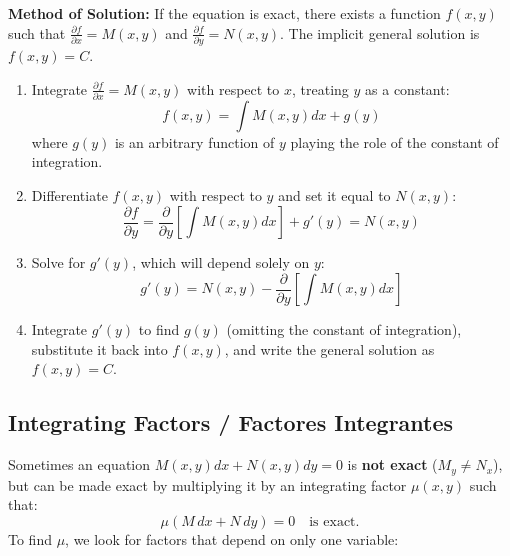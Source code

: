 \documentclass[11pt,letterpaper]{article}
\begin{document}
\textbf{Method of Solution:}
If the equation is exact, there exists a function $f(x,y)$ such that $\frac{\partial f}{\partial x} = M(x,y)$ and $\frac{\partial f}{\partial y} = N(x,y)$. The implicit general solution is $f(x,y) = C$.
\begin{enumerate}
    \item Integrate $\frac{\partial f}{\partial x} = M(x,y)$ with respect to $x$, treating $y$ as a constant:
    \begin{equation}
        f(x,y) = \int M(x,y) dx + g(y)
    \end{equation}
    where $g(y)$ is an arbitrary function of $y$ playing the role of the constant of integration.
    \item Differentiate $f(x,y)$ with respect to $y$ and set it equal to $N(x,y)$:
    \begin{equation}
        \frac{\partial f}{\partial y} = \frac{\partial}{\partial y} \left[ \int M(x,y) dx \right] + g'(y) = N(x,y)
    \end{equation}
    \item Solve for $g'(y)$, which will depend solely on $y$:
    \begin{equation}
        g'(y) = N(x,y) - \frac{\partial}{\partial y} \left[ \int M(x,y) dx \right]
    \end{equation}
    \item Integrate $g'(y)$ to find $g(y)$ (omitting the constant of integration), substitute it back into $f(x,y)$, and write the general solution as $f(x,y) = C$.
\end{enumerate}

\subsection{Integrating Factors / Factores Integrantes}
Sometimes an equation $M(x,y)dx + N(x,y)dy = 0$ is \textbf{not exact} ($M_y \neq N_x$), but can be made exact by multiplying it by an integrating factor $\mu(x,y)$ such that:
\begin{equation}
    \mu(M\,dx + N\,dy) = 0 \quad \text{is exact.}
\end{equation}
To find $\mu$, we look for factors that depend on only one variable:
\end{document}
